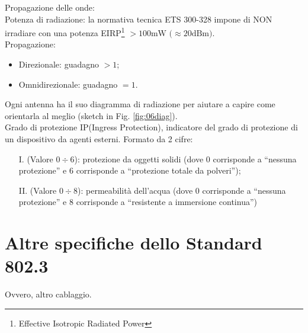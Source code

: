 \noindent Propagazione delle onde:\\
\noindent Potenza di radiazione: la normativa tecnica ETS 300-328 impone di NON irradiare con una potenza EIRP\footnote{Effective Isotropic Radiated Power} $> 100 \text{mW (}\approx 20\text{dBm)}$.\\

\noindent Propagazione:\begin{itemize}
    \item Direzionale: guadagno $>1$;
    \item Omnidirezionale: guadagno $=1$.
\end{itemize}

\noindent Ogni antenna ha il suo diagramma di radiazione per aiutare a capire come orientarla al meglio (sketch in Fig. \ref{fig:06diag}).\\

\noindent Grado di protezione IP(Ingress Protection), indicatore del grado di protezione di un dispositivo da agenti esterni. Formato da 2 cifre:
\begin{itemize}
    \item [I.] (Valore $0\div6$): protezione da oggetti solidi (dove 0 corrisponde a ``nessuna protezione'' e 6 corrisponde a ``protezione totale da polveri'');
    \item [II.] (Valore $0\div8$): permeabilità dell'acqua (dove 0 corrisponde a ``nessuna protezione'' e 8 corrisponde a ``resistente a immersione continua'')
\end{itemize}

\section*{Altre specifiche dello Standard 802.3}
\noindent Ovvero, altro cablaggio.\\

